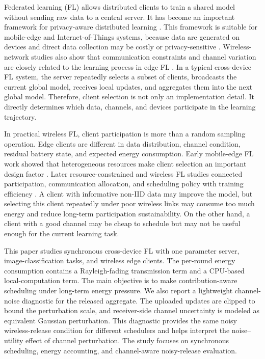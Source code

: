 \documentclass[journal]{IEEEtran}
\begin{document}
Federated learning (FL) \cite{mcmahan2017communication} allows distributed clients to train a shared model without sending raw data to a central server. It has become an important framework for privacy-aware distributed learning \cite{kairouz2021advances}. This framework is suitable for mobile-edge and Internet-of-Things systems, because data are generated on devices and direct data collection may be costly or privacy-sensitive \cite{lim2020federated,khan2021federated}. Wireless-network studies also show that communication constraints and channel variation are closely related to the learning process in edge FL \cite{chen2021distributed}. In a typical cross-device FL system, the server repeatedly selects a subset of clients, broadcasts the current global model, receives local updates, and aggregates them into the next global model. Therefore, client selection is not only an implementation detail. It directly determines which data, channels, and devices participate in the learning trajectory.

In practical wireless FL, client participation is more than a random sampling operation. Edge clients are different in data distribution, channel condition, residual battery state, and expected energy consumption. Early mobile-edge FL work showed that heterogeneous resources make client selection an important design factor \cite{nishio2019client}. Later resource-constrained and wireless FL studies connected participation, communication allocation, and scheduling policy with training efficiency \cite{wang2019adaptive,chen2021joint,yang2020scheduling}. A client with informative non-IID data may improve the model, but selecting this client repeatedly under poor wireless links may consume too much energy and reduce long-term participation sustainability. On the other hand, a client with a good channel may be cheap to schedule but may not be useful enough for the current learning task.

This paper studies synchronous cross-device FL with one parameter server, image-classification tasks, and wireless edge clients. The per-round energy consumption contains a Rayleigh-fading transmission term and a CPU-based local-computation term. The main objective is to make contribution-aware scheduling under long-term energy pressure. We also report a lightweight channel-noise diagnostic for the released aggregate. The uploaded updates are clipped to bound the perturbation scale, and receiver-side channel uncertainty is modeled as equivalent Gaussian perturbation. This diagnostic provides the same noisy wireless-release condition for different schedulers and helps interpret the noise--utility effect of channel perturbation. The study focuses on synchronous scheduling, energy accounting, and channel-aware noisy-release evaluation.
\end{document}
